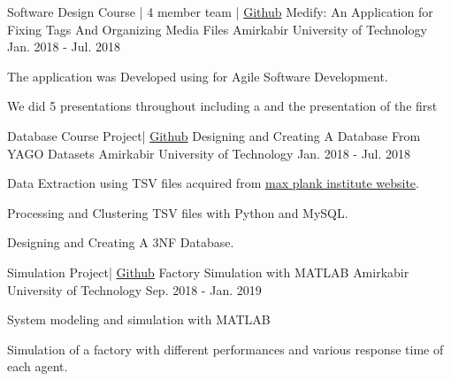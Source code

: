 \documentclass[11pt, a4paper]{awesome-cv}
\begin{document}
\begin{cventries}
	
	\cventry
	{Software Design Course | 4 member team | \href{https://github.com/pouyaaghahoseini/Medify}{\faGithubSquare\acvHeaderIconSep Github}} %
	{Medify: An Application for Fixing Tags And Organizing Media Files} %
	{Amirkabir University of Technology} %
	{Jan. 2018 - Jul. 2018} %
	{
		\begin{cvitems} %
			\item {The application was Developed using  for Agile Software Development.}
			\item {We did 5 presentations throughout including a  and the presentation of the first }
		\end{cvitems}
	}
	
	\cventry
	{Database Course Project| \href{https://github.com/pouyaaghahoseini/Database-Course}{\faGithubSquare\acvHeaderIconSep Github}} %
	{Designing and Creating A Database From YAGO Datasets} %
	{Amirkabir University of Technology} %
	{Jan. 2018 - Jul. 2018} %
	{
		\begin{cvitems} %
			\item {Data Extraction using TSV files acquired from \href{https://www.mpi-inf.mpg.de/departments/databases-and-information-systems/research/yago-naga/yago/downloads/}{max plank institute website}.}
			\item {Processing and Clustering TSV files with Python and MySQL.}
			\item {Designing and Creating A 3NF Database.}
		\end{cvitems}
	}
	
	\cventry
	{Simulation  Project| \href{https://github.com/pouyaaghahoseini/System-Queueing-Simulation}{\faGithubSquare\acvHeaderIconSep Github}} %
	{Factory Simulation with MATLAB} %
	{Amirkabir University of Technology} %
	{Sep. 2018 - Jan. 2019} %
	{
		\begin{cvitems} %
			\item {System modeling and simulation with MATLAB}
			\item {Simulation of a factory with different performances and various response time of each agent.}	
		\end{cvitems}
	}
\end{cventries}



\end{document}
